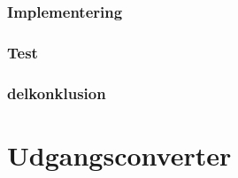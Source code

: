 \documentclass[../main.tex]{subfiles}
\begin{document}
\subsubsection{Implementering}

\subsubsection{Test}

\subsubsection{delkonklusion}


\section{Udgangsconverter}

\subsection{}
\end{document}

